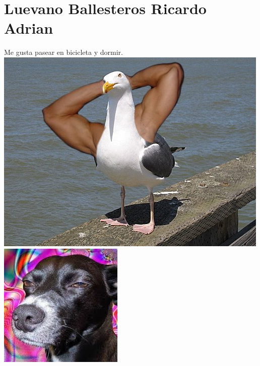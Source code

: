 \chapter{Luevano Ballesteros Ricardo Adrian}
Me gusta pasear en bicicleta y dormir.
\includegraphics{410003725/pajarito.jpg}
\includegraphics{410003725/perro.jpg}
